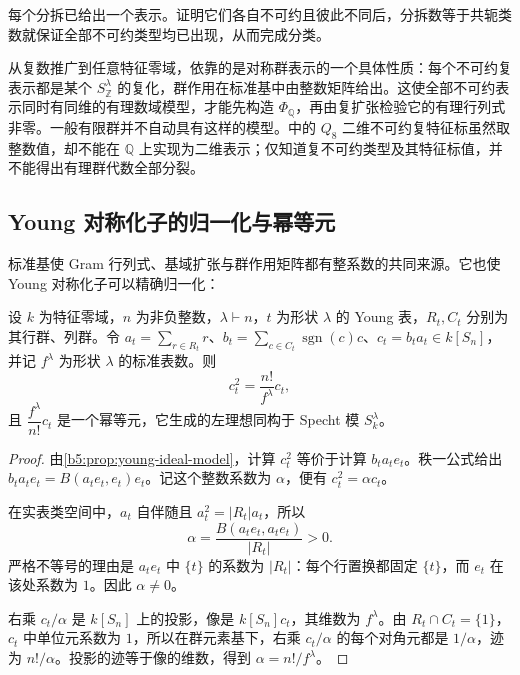 每个分拆已给出一个表示。证明它们各自不可约且彼此不同后，分拆数等于共轭类数就保证全部不可约类型均已出现，从而完成分类。

\ProseParagraphBreak
从复数推广到任意特征零域，依靠的是对称群表示的一个具体性质：每个不可约复表示都是某个 \(S_{\mathbb Z}^\lambda\) 的复化，群作用在标准基中由整数矩阵给出。这使全部不可约表示同时有同维的有理数域模型，才能先构造 \(\Phi_{\mathbb Q}\)，再由复扩张检验它的有理行列式非零。一般有限群并不自动具有这样的模型。中的 \(Q_8\) 二维不可约复特征标虽然取整数值，却不能在 \(\mathbb Q\) 上实现为二维表示；仅知道复不可约类型及其特征标值，并不能得出有理群代数全部分裂。

\subsection{Young 对称化子的归一化与幂等元}
\label{b5:subsec:0604:04}

标准基使 Gram 行列式、基域扩张与群作用矩阵都有整系数的共同来源。它也使 Young 对称化子可以精确归一化：

\begin{proposition}\label{b5:prop:young-quasi-idempotent}
	设 \(k\) 为特征零域，\(n\) 为非负整数，\(\lambda\vdash n\)，\(t\) 为形状 \(\lambda\) 的 Young 表，\(R_t,C_t\) 分别为其行群、列群。令 \(a_t=\sum_{r\in R_t}r\)、\(b_t=\sum_{c\in C_t}\operatorname{sgn}(c)c\)、\(c_t=b_ta_t\in k[S_n]\)，并记 \(f^\lambda\) 为形状 \(\lambda\) 的标准表数。则
	\[
		c_t^2=\frac{n!}{f^\lambda}c_t,
	\]
	且 \(\dfrac{f^\lambda}{n!}c_t\) 是一个幂等元，它生成的左理想同构于 Specht 模 \(S_k^\lambda\)。
\end{proposition}
\begin{proof}
	由\cref{b5:prop:young-ideal-model}，计算 \(c_t^2\) 等价于计算 \(b_ta_te_t\)。秩一公式给出 \(b_ta_te_t=B(a_te_t,e_t)e_t\)。记这个整数系数为 \(\alpha\)，便有 \(c_t^2=\alpha c_t\)。

	在实表类空间中，\(a_t\) 自伴随且 \(a_t^2=|R_t|a_t\)，所以
	\[
		\alpha=\frac{B(a_te_t,a_te_t)}{|R_t|}>0.
	\]
	严格不等号的理由是 \(a_te_t\) 中 \(\{t\}\) 的系数为 \(|R_t|\)：每个行置换都固定 \(\{t\}\)，而 \(e_t\) 在该处系数为 \(1\)。因此 \(\alpha\ne0\)。

	右乘 \(c_t/\alpha\) 是 \(k[S_n]\) 上的投影，像是 \(k[S_n]c_t\)，其维数为 \(f^\lambda\)。由 \(R_t\cap C_t=\{1\}\)，\(c_t\) 中单位元系数为 \(1\)，所以在群元素基下，右乘 \(c_t/\alpha\) 的每个对角元都是 \(1/\alpha\)，迹为 \(n!/\alpha\)。投影的迹等于像的维数，得到 \(\alpha=n!/f^\lambda\)。
\end{proof}

